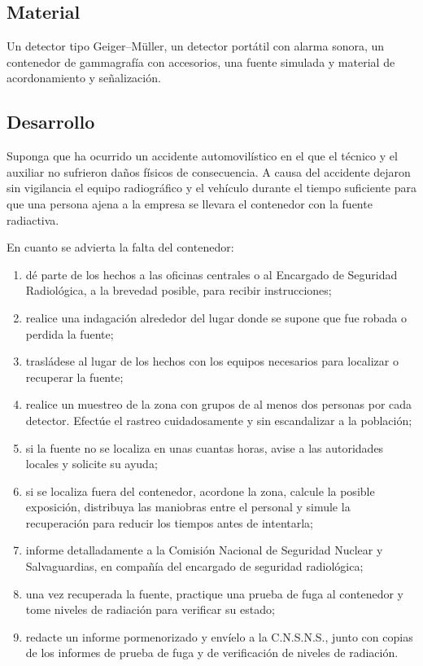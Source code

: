 \subsection*{Material}
Un detector tipo Geiger--Müller, un detector portátil con alarma sonora, un contenedor de gammagrafía con accesorios, una fuente simulada y material de acordonamiento y señalización.

\subsection*{Desarrollo}
Suponga que ha ocurrido un accidente automovilístico en el que el técnico y el auxiliar no sufrieron daños físicos de consecuencia. A causa del accidente dejaron sin vigilancia el equipo radiográfico y el vehículo durante el tiempo suficiente para que una persona ajena a la empresa se llevara el contenedor con la fuente radiactiva.

En cuanto se advierta la falta del contenedor:
\begin{enumerate}
  \item dé parte de los hechos a las oficinas centrales o al Encargado de Seguridad Radiológica, a la brevedad posible, para recibir instrucciones;
  \item realice una indagación alrededor del lugar donde se supone que fue robada o perdida la fuente;
  \item trasládese al lugar de los hechos con los equipos necesarios para localizar o recuperar la fuente;
  \item realice un muestreo de la zona con grupos de al menos dos personas por cada detector. Efectúe el rastreo cuidadosamente y sin escandalizar a la población;
  \item si la fuente no se localiza en unas cuantas horas, avise a las autoridades locales y solicite su ayuda;
  \item si se localiza fuera del contenedor, acordone la zona, calcule la posible exposición, distribuya las maniobras entre el personal y simule la recuperación para reducir los tiempos antes de intentarla;
  \item informe detalladamente a la Comisión Nacional de Seguridad Nuclear y Salvaguardias, en compañía del encargado de seguridad radiológica;
  \item una vez recuperada la fuente, practique una prueba de fuga al contenedor y tome niveles de radiación para verificar su estado;
  \item redacte un informe pormenorizado y envíelo a la C.N.S.N.S., junto con copias de los informes de prueba de fuga y de verificación de niveles de radiación.
\end{enumerate}
